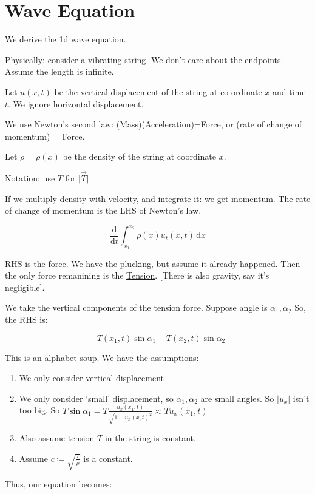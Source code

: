 \documentclass{article}
\theoremstyle{definition}
\begin{document}
\section*{Wave Equation}

We derive the 1d wave equation.

Physically: consider a \underline{vibrating string}. We don't care about the endpoints. Assume the length is infinite.

Let \(u(x,t)\) be the \underline{vertical displacement} of the string at co-ordinate \(x\) and time \(t\). We ignore horizontal displacement.

We use Newton's second law: (Mass)(Acceleration)=Force, or (rate of change of momentum) = Force.

Let \(\rho=\rho(x)\) be the density of the string at coordinate \(x\).

Notation: use \(T\) for \(\vert \vec{T} \vert \) 

If we multiply density with velocity, and integrate it: we get momentum. The rate of change of momentum is the LHS of Newton's law.

\[
    \frac{\mathrm{d}}{\mathrm{d}t} \int_{x_1}^{x_2} \rho(x)u_t(x,t) \,\mathrm{d}x 
\]

RHS is the force. We have the plucking, but assume it already happened. Then the only force remanining is the \underline{Tension}. [There is also gravity, say it's negligible].

We take the vertical components of the tension force. Suppose angle is \(\alpha_1,\alpha_2\)  So, the RHS is:

\[
    - T(x_1,t)\sin \alpha_1 + T(x_2,t)\sin \alpha_2
\]

This is an alphabet soup. We have the assumptions:

\begin{enumerate}
    \item We only consider vertical displacement
    \item We only consider `small' displacement, so \(\alpha_1,\alpha_2\) are small angles. So \(\vert u_x \vert \) isn't too big. So \(T\sin \alpha_1 = T\frac{u_x(x_1,t)}{\sqrt{1 + u_x(x,t)^2} }\approx T u_x(x_1,t)\)
    \item Also assume tension \(T\) in the string is constant.
    \item Assume \(c \coloneqq \sqrt{\frac{T}{\rho}}\) is a constant.
\end{enumerate}

Thus, our equation becomes:
\end{document}
